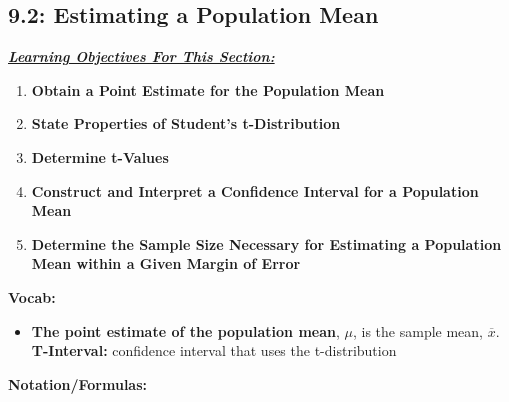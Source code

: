 \documentclass{report}
\begin{document}
     \pagebreak \bigbreak \noindent 
     \subsection{9.2: Estimating a Population Mean}
     \bigbreak \noindent 
     \textbf{\textit{\underline{Learning Objectives For This Section:}}}
     \begin{enumerate}
         \item \textbf{Obtain a Point Estimate for the Population Mean}
         \item \textbf{State Properties of Student’s t-Distribution}
         \item \textbf{Determine t-Values}
         \item \textbf{Construct and Interpret a Confidence Interval for a Population Mean}
         \item \textbf{Determine the Sample Size Necessary for Estimating a Population Mean within a Given Margin of Error}
     \end{enumerate}
     \bigbreak \noindent 
     \textbf{Vocab:}
     \begin{itemize}
         \item \textbf{The point estimate of the population mean}, $\mu$, is the sample mean, $\overline{x}$.
        \textbf{T-Interval:} confidence interval that uses the t-distribution
     \end{itemize}
     \bigbreak \noindent 
     \textbf{Notation/Formulas:}
\end{document}
